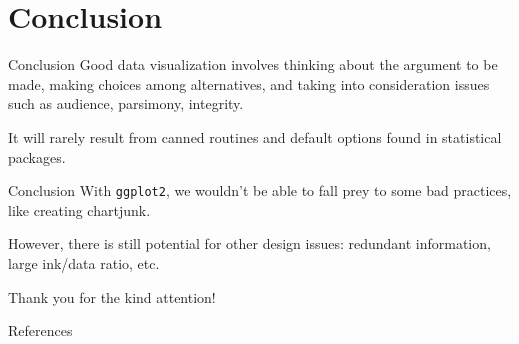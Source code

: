 \documentclass[12pt,english,pdf,dvipsnames,handout]{beamer}
\begin{document}
\section{Conclusion}

\begin{frame}{Conclusion}
Good data visualization involves thinking about the argument to be made, making choices among alternatives, and taking into consideration issues such as audience, parsimony, integrity.\bigskip

It will rarely result from canned routines and default options found in statistical packages.
\end{frame}


\begin{frame}{Conclusion}
With \texttt{ggplot2}, we wouldn't be able to fall prey to some bad practices, like creating chartjunk.\bigskip

However, there is still potential for other design issues: redundant information, large ink/data ratio, etc.
\end{frame}


\begin{frame}
\begin{center}
	\Huge Thank \textcolor{title}{you} for the kind attention!
\end{center}
\end{frame}

\begin{frame}[plain,c]
	\begin{center}
		\Huge References
	\end{center}
\end{frame}


\begin{frame}
\renewcommand{\section}[2]{}


\end{frame}
\end{document}
